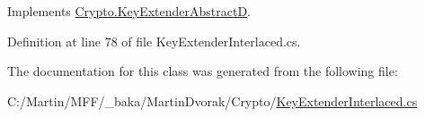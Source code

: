 Implements \hyperlink{class_crypto_1_1_key_extender_abstract_d_a954261bd6f533ad7745beac9ce89dd6e}{Crypto.\+Key\+Extender\+Abstract\+D}.



Definition at line 78 of file Key\+Extender\+Interlaced.\+cs.



The documentation for this class was generated from the following file\+:\begin{DoxyCompactItemize}
\item 
C\+:/\+Martin/\+M\+F\+F/\+\_\+baka/\+Martin\+Dvorak/\+Crypto/\hyperlink{_key_extender_interlaced_8cs}{Key\+Extender\+Interlaced.\+cs}\end{DoxyCompactItemize}
